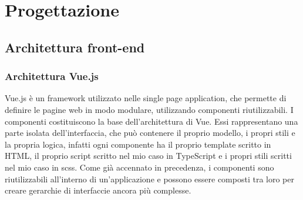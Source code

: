 \section{Progettazione}
\label{sec:progettazione}

\subsection{Architettura front-end}\label{subsec:architettura-front-end}
\subsubsection{Architettura Vue.js}\label{subsubsec:architettura-vue.js}
Vue.js è un framework utilizzato nelle single page application, che permette di definire le pagine web in modo modulare, utilizzando componenti riutilizzabili.
I componenti costituiscono la base dell'architettura di Vue. Essi rappresentano una parte isolata dell'interfaccia, che può contenere il proprio modello, i propri stili e la propria logica, infatti ogni componente ha il proprio
template scritto in HTML, il proprio script scritto nel mio caso in TypeScript e i propri stili scritti nel mio caso in scss.
Come già accennato in precedenza, i componenti sono riutilizzabili all'interno di un'applicazione e possono essere composti tra loro per creare gerarchie di interfaccie ancora più complesse.\\

